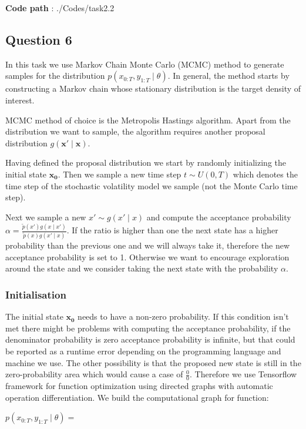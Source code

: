 \documentclass[]{article}
\begin{document}
	\textbf{Code path} : ./Codes/task2.2  
	
	\subsection*{Question 6}
	In this task we use Markov Chain Monte Carlo (MCMC) method to generate samples for the distribution $p(x_{0:T}, y_{1:T} \mid \theta)$. In general, the method starts by constructing a Markov chain whose stationary distribution is the target density of interest. 
	
	MCMC method of choice is the Metropolis Hastings algorithm.
	Apart from the distribution we want to sample, the algorithm requires another proposal distribution $g(\mathbf{x'} \mid \mathbf{x})$.
	
	
	Having defined the proposal distribution we start by randomly initializing the initial state $\mathbf{x_0}$. Then we sample a new time step $ t \sim U(0,T)$ which denotes the time step of the stochastic volatility model we sample (not the Monte Carlo time step). 
	
	Next we sample a new $x' \sim g(x' \mid x)$ and compute the acceptance probability $ \alpha = \frac{ \widetilde{p}(x')g(x \mid x') }{  \widetilde{p}(x)g(x' \mid x) }$. If the ratio is higher than one the next state has a higher probability than the previous one and we will always take it, therefore the new acceptance probability is set to 1. Otherwise we want to encourage exploration around the state and we consider taking the next state with the probability $\alpha$.  
	
	\subsubsection*{Initialisation}
	
	The initial state $\mathbf{x_0}$ needs to have a non-zero probability. If this condition isn't met there might be problems with computing the acceptance probability, if the denominator probability is zero acceptance probability is infinite, but that could be reported as a runtime error depending on the programming language and machine we use. The other possibility is that the proposed new state is still in the zero-probability area which would cause a case of $\frac{0}{0}$. Therefore we use Tensorflow framework for function optimization using directed graphs with automatic operation differentiation. We build the computational graph for function:
	
	$ p(x_{0:T}, y_{1:T} \mid \theta) = $
	
\end{document}
